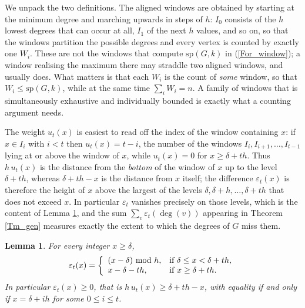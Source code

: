 \documentclass[10pt,a4paper]{article}
\newtheorem{lemma}[theorem]{Lemma}
\begin{document}
We unpack the two definitions. The aligned windows are obtained by starting at
the minimum degree and marching upwards in steps of $h$: $I_{0}$ consists of the
$h$ lowest degrees that can occur at all, $I_{1}$ of the next $h$ values, and so
on, so that the windows partition the possible degrees and every vertex is
counted by exactly one $W_{i}$. These are not the windows that compute
$\mathrm{sp}(G,k)$ in (\ref{For_window}); a window realising the maximum there
may straddle two aligned windows, and usually does. What matters is that each
$W_{i}$ is the count of \emph{some} window, so that $W_{i}\leq \mathrm{sp}(G,k)$,
while at the same time $\sum_{i}W_{i}=n$. A family of windows that is
simultaneously exhaustive and individually bounded is exactly what a counting
argument needs.

The weight $u_{t}(x)$ is easiest to read off the index of the window containing
$x$: if $x\in I_{i}$ with $i<t$ then $u_{t}(x)=t-i$, the number of the windows
$I_{i},I_{i+1},\ldots ,I_{t-1}$ lying at or above the window of $x$, while
$u_{t}(x)=0$ for $x\geq \delta +th$. Thus $h\,u_{t}(x)$ is the distance from the
\emph{bottom} of the window of $x$ up to the level $\delta +th$, whereas
$\delta +th-x$ is the distance from $x$ itself; the difference
$\varepsilon _{t}(x)$ is therefore the height of $x$ above the largest of the
levels $\delta ,\delta +h,\ldots ,\delta +th$ that does not exceed $x$. In
particular $\varepsilon _{t}$ vanishes precisely on those levels, which is the
content of Lemma \ref{Lemma_gen}, and the sum $\sum_{v}\varepsilon _{t}(\deg
(v))$ appearing in Theorem \ref{Tm_gen} measures exactly the extent to which the
degrees of $G$ miss them.



\begin{lemma}
\label{Lemma_gen}For every integer $x\geq \delta $,
\[
\varepsilon _{t}(x)=\left\{
\begin{array}
[c]{ll}%
(x-\delta )\ \mathrm{mod}\ h, & \text{if }\delta \leq x<\delta +th,\\
x-\delta -th, & \text{if }x\geq \delta +th.
\end{array}
\right.
\]
In particular $\varepsilon _{t}(x)\geq 0$, that is $h\,u_{t}(x)\geq \delta +th-x$, with equality if
and only if $x=\delta +ih$ for some $0\leq i\leq t$.
\end{lemma}
\end{document}
